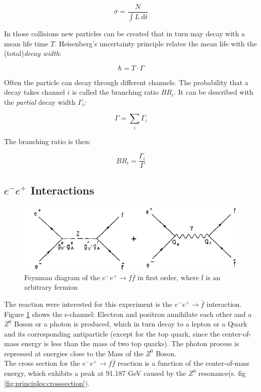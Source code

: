 \begin{equation}
\sigma = \frac{N}{\int L~\text{d}t}
\end{equation}

In those collisions new particles can be created that in turn may decay with a mean life time $T$.
Heisenberg's uncertainty principle relates the mean life with the (total)\emph{decay width}:

\begin{equation}
\hbar=T\cdot\Gamma
\end{equation}

Often the particle can decay through different channels. The probability that a decay takes channel $i$ is called the branching ratio $BR_i$. It can be described with the \emph{partial} decay width $\Gamma_i$:

\begin{equation}
\Gamma = \sum_i \Gamma_i
\end{equation}

The branching ratio is then:

\begin{equation}
BR_i=\frac{\Gamma_i}{\Gamma}
\label{eq:principles:branching ratio}
\end{equation}

\subsection{$e^-e^+$ Interactions}
\label{sec:ee interaction}
\begin{figure}[ht]
	\centering
	\includegraphics{graphics/annihilation.png}
	\caption{Feynman diagram of the $e^-e^+ \rightarrow f\bar{f}$ in first order, where f is an arbitrary fermion}
	\label{fig:principles:annihilation.png}
\end{figure}

The reaction were interested for this experiment is the $e^-e^+\rightarrow\bar{f}$ interaction. Figure \ref{fig:principles:annihilation.png} shows the s-channel: Electron and positron annihilate each other and a $Z^0$ Boson or a photon is produced, which in turn decay to a lepton or a Quark and its corresponding antiparticle (except for the top quark, since the center-of-mass energy is less than the mass of two top quarks). The photon process is repressed at energies close to the Mass of the $Z^0$ Boson\cite{muenchen}.\\%
The cross section for the $e^-e^+\rightarrow f\bar{f}$ reaction is a function of the center-of-mass energy, which exhibits a peak at 91.187 GeV caused by the $Z^0$ resonance(s. fig \ref{fig:principles:crosssection}).

